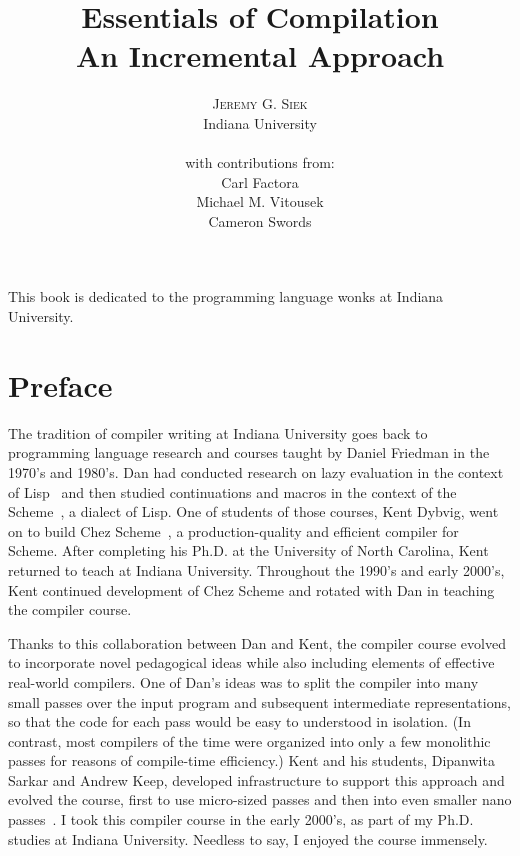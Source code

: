\documentclass[11pt]{book}
\title{\Huge \textbf{Essentials of Compilation} \\ 
  \huge An Incremental Approach}
\author{\textsc{Jeremy G. Siek} \\
  Indiana University \\
  \\
  with contributions from: \\
  Carl Factora \\
  Michael M. Vitousek \\
  Cameron Swords
   }
\newenvironment{dedication}
{
   \cleardoublepage
   \thispagestyle{empty}
   \vspace*{\stretch{1}}
   \hfill\begin{minipage}[t]{0.66\textwidth}
   \raggedright
}
{
   \end{minipage}
   \vspace*{\stretch{3}}
   \clearpage
}
\begin{document}
\frontmatter
\maketitle

\begin{dedication}
This book is dedicated to the programming language wonks at Indiana
University.
\end{dedication}

\tableofcontents

\mainmatter

\chapter*{Preface}

The tradition of compiler writing at Indiana University goes back to
programming language research and courses taught by Daniel Friedman in
the 1970's and 1980's. Dan had conducted research on lazy evaluation
in the context of Lisp~\citep{McCarthy:1960dz} and then studied
continuations and macros in the context of the
Scheme~\citep{Sussman:1975ab}, a dialect of Lisp.  One of students of
those courses, Kent Dybvig, went on to build Chez
Scheme~\citep{Dybvig:2006aa}, a production-quality and efficient
compiler for Scheme. After completing his Ph.D. at the University of
North Carolina, Kent returned to teach at Indiana University.
Throughout the 1990's and early 2000's, Kent continued development of
Chez Scheme and rotated with Dan in teaching the compiler course.

Thanks to this collaboration between Dan and Kent, the compiler course
evolved to incorporate novel pedagogical ideas while also including
elements of effective real-world compilers.  One of Dan's ideas was to
split the compiler into many small passes over the input program and
subsequent intermediate representations, so that the code for each
pass would be easy to understood in isolation.  (In contrast, most
compilers of the time were organized into only a few monolithic passes
for reasons of compile-time efficiency.)  Kent and his students,
Dipanwita Sarkar and Andrew Keep, developed infrastructure to support
this approach and evolved the course, first to use micro-sized passes
and then into even smaller nano
passes~\citep{Sarkar:2004fk,Keep:2012aa}. I took this compiler course
in the early 2000's, as part of my Ph.D. studies at Indiana
University. Needless to say, I enjoyed the course immensely.
\end{document}

